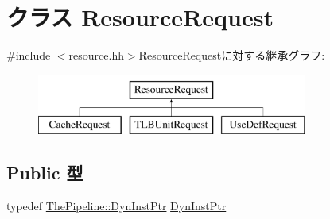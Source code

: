 \hypertarget{classResourceRequest}{
\section{クラス ResourceRequest}
\label{classResourceRequest}
}


{\ttfamily \#include $<$resource.hh$>$}ResourceRequestに対する継承グラフ:\begin{figure}[H]
\begin{center}
\leavevmode
\includegraphics[height=2cm]{classResourceRequest}
\end{center}
\end{figure}
\subsection*{Public 型}
\begin{DoxyCompactItemize}
\item 
typedef \hyperlink{classRefCountingPtr}{ThePipeline::DynInstPtr} \hyperlink{classResourceRequest_af9d0c8a46736ba6aa2d8bb94da1a5e73}{DynInstPtr}
\end{DoxyCompactItemize}

